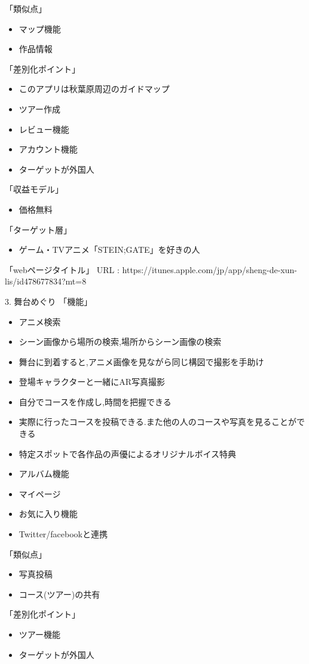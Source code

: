 「類似点」
\begin{itemize}
\item マップ機能
\item 作品情報
\end{itemize}
「差別化ポイント」
\begin{itemize}
\item このアプリは秋葉原周辺のガイドマップ
\item ツアー作成
\item レビュー機能
\item アカウント機能
\item ターゲットが外国人
\end{itemize}
「収益モデル」
\begin{itemize}
\item 価格無料
\end{itemize}
「ターゲット層」
\begin{itemize}
\item ゲーム・TVアニメ「STEIN;GATE」を好きの人
\end{itemize}
「webページタイトル」
URL : https://itunes.apple.com/jp/app/sheng-de-xun-lis/id478677834?mt=8
\par
3. 舞台めぐり
「機能」
\begin{itemize}
\item アニメ検索
\item シーン画像から場所の検索,場所からシーン画像の検索
\item 舞台に到着すると,アニメ画像を見ながら同じ構図で撮影を手助け
\item 登場キャラクターと一緒にAR写真撮影
\item 自分でコースを作成し,時間を把握できる
\item 実際に行ったコースを投稿できる.また他の人のコースや写真を見ることができる
\item 特定スポットで各作品の声優によるオリジナルボイス特典
\item アルバム機能
\item マイページ
\item お気に入り機能
\item Twitter/facebookと連携
\end{itemize}
「類似点」
\begin{itemize}
\item 写真投稿
\item コース(ツアー)の共有
\end{itemize}
「差別化ポイント」
\begin{itemize}
\item ツアー機能
\item ターゲットが外国人
\end{itemize}
